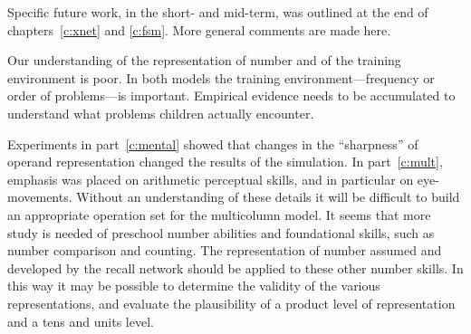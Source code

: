 Specific future work, in the short- and mid-term, was outlined at the end
of chapters~\ref{c:xnet} and \ref{c:fsm}.  More general comments are
made here.

Our understanding of the representation of number and of the training
environment is poor. In both models the training environment---frequency or
order of problems---is important.  Empirical evidence needs to be
accumulated to understand what problems children actually encounter.

Experiments in part~\ref{c:mental} showed that changes in the ``sharpness''
of operand representation changed the results of the simulation.  In
part~\ref{c:mult}, emphasis was placed on arithmetic perceptual skills, and
in particular on eye-movements. Without an understanding of these details
it will be difficult to build an appropriate operation set for the
multicolumn model. It seems that more study is needed of preschool number
abilities and foundational skills, such as number comparison and counting.
The representation of number assumed and developed by the recall network
should be applied to these other number skills.  In this way it may be
possible to determine the validity of the various representations, and
evaluate the plausibility of a product level of representation and a tens
and units level.
